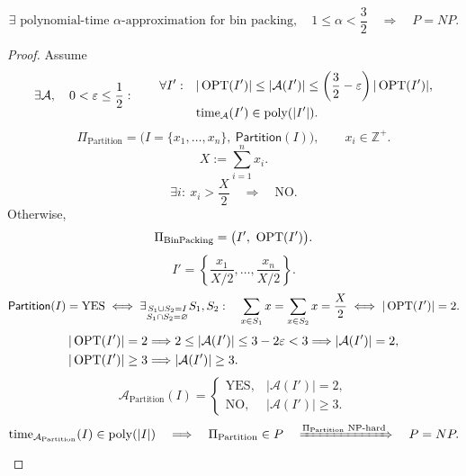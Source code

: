 \documentclass[12pt,a4paper]{article}
\begin{document}
\begin{theorem}
\[
\exists\text{ polynomial-time }\alpha\text{-approximation for bin packing},
\quad 1\leq\alpha<\frac32
\quad\Longrightarrow\quad P=NP.
\]
\end{theorem}
\begin{proof}
Assume
\[
\exists\mathcal A,\quad 0<\varepsilon\leq\frac12:\qquad
\begin{aligned}
\forall I':\quad &|\operatorname{OPT}(I')|\leq|\mathcal A(I')|
\leq\left(\frac32-\varepsilon\right)|\operatorname{OPT}(I')|,\\
&\mathrm{time}_{\mathcal A}(I')\in\operatorname{poly}(|I'|).
\end{aligned}
\]
\[
\Pi_{\mathrm{Partition}}
=\bigl(I=\{x_1,\ldots,x_n\},\ \mathsf{Partition}(I)\bigr),
\qquad x_i\in\mathbb Z^{+}.
\]
\[
X:=\sum_{i=1}^n x_i.
\]
\[
\exists i:\ x_i>\frac X2\quad\Longrightarrow\quad\mathrm{NO}.
\]
Otherwise,
\[
\Pi_{\mathrm{BinPacking}}=\bigl(I',\ \OPT(I')\bigr).
\]
\[
I'=\left\{\frac{x_1}{X/2},\ldots,\frac{x_n}{X/2}\right\}.
\]
\[
\mathsf{Partition}(I)=\mathrm{YES}
\iff \exists_{\substack{S_1\cup S_2=I\\S_1\cap S_2=\varnothing}} S_1,S_2:\quad
\sum_{x\in S_1}x=\sum_{x\in S_2}x=\frac X2
\iff |\operatorname{OPT}(I')|=2.
\]
\[
\begin{aligned}
|\operatorname{OPT}(I')|=2
&\Longrightarrow 2\leq|\mathcal A(I')|\leq3-2\varepsilon<3
\Longrightarrow |\mathcal A(I')|=2,\\
|\operatorname{OPT}(I')|\geq3
&\Longrightarrow |\mathcal A(I')|\geq3.
\end{aligned}
\]
\[
\mathcal A_{\mathrm{Partition}}(I)=
\begin{cases}
\mathrm{YES},&|\mathcal A(I')|=2,\\
\mathrm{NO},&|\mathcal A(I')|\geq3.
\end{cases}
\]
\[
\mathrm{time}_{\mathcal A_{\mathrm{Partition}}}(I)\in\operatorname{poly}(|I|)
\quad\Longrightarrow\quad
\Pi_{\mathrm{Partition}}\in P
\quad\xRightarrow{\Pi_{\mathrm{Partition}}\text{ NP-hard}}\quad P=NP.
\]
\end{proof}
\end{document}
